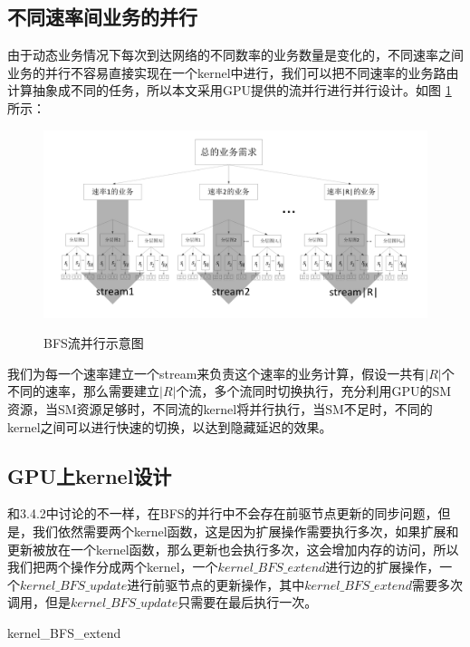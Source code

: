 \subsection{不同速率间业务的并行}
由于动态业务情况下每次到达网络的不同数率的业务数量是变化的，不同速率之间业务的并行不容易直接实现在一个kernel中进行，我们可以把不同速率的业务路由计算抽象成不同的任务，所以本文采用GPU提供的流并行进行并行设计。如图 \ref{bfssteam}所示：
\begin{figure}
\setlength{\belowcaptionskip}{-0.5cm}
\begin{center}
{\includegraphics[width=1 \textwidth]{figures/hbfs.pdf}}
\end{center}
\caption{{\footnotesize{BFS流并行示意图}}}
\label{bfssteam}
\end{figure}

我们为每一个速率建立一个stream来负责这个速率的业务计算，假设一共有$|R|$个不同的速率，那么需要建立$|R|$个流，多个流同时切换执行，充分利用GPU的SM资源，当SM资源足够时，不同流的kernel将并行执行，当SM不足时，不同的kernel之间可以进行快速的切换，以达到隐藏延迟的效果。

\subsection{GPU上kernel设计}
和3.4.2中讨论的不一样，在BFS的并行中不会存在前驱节点更新的同步问题，但是，我们依然需要两个kernel函数，这是因为扩展操作需要执行多次，如果扩展和更新被放在一个kernel函数，那么更新也会执行多次，这会增加内存的访问，所以我们把两个操作分成两个kernel，一个$kernel\_BFS\_extend$进行边的扩展操作，一个$kernel\_BFS\_update$进行前驱节点的更新操作，其中$kernel\_BFS\_extend$需要多次调用，但是$kernel\_BFS\_update$只需要在最后执行一次。
\begin{algorithm}[t]
\begin{algorithmic}[1]
\EndIf
{}
\EndIf
\EndFunction
\end{algorithmic}
\caption{kernel\_BFS\_extend}
\label{KernelBFS}
\end{algorithm}

